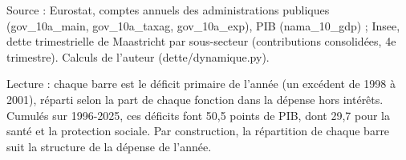 Source : Eurostat, comptes annuels des administrations publiques (gov\_10a\_main, gov\_10a\_taxag, gov\_10a\_exp), PIB (nama\_10\_gdp) ; Insee, dette trimestrielle de Maastricht par sous-secteur (contributions consolidées, 4e trimestre). Calculs de l'auteur (dette/dynamique.py).\par Lecture : chaque barre est le déficit primaire de l'année (un excédent de 1998 à 2001), réparti selon la part de chaque fonction dans la dépense hors intérêts. Cumulés sur 1996-2025, ces déficits font 50,5 points de PIB, dont 29,7 pour la santé et la protection sociale. Par construction, la répartition de chaque barre suit la structure de la dépense de l'année.
